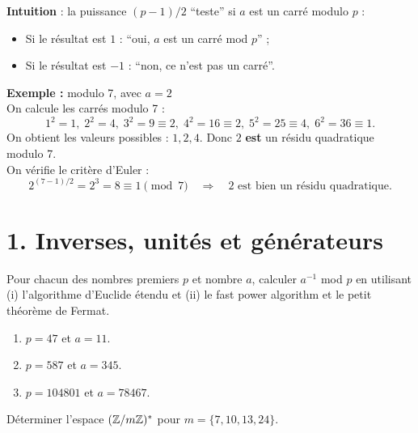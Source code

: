 \textbf{Intuition} : la puissance $(p-1)/2$ “teste” si $a$ est un carré modulo $p$ :
\begin{itemize}
    \item Si le résultat est $1$ : “oui, $a$ est un carré mod $p$” ;
    \item Si le résultat est $-1$ : “non, ce n’est pas un carré”. \\
\end{itemize}

\textbf{Exemple : } modulo 7, avec $a=2$ \\

On calcule les carrés modulo 7 :
\[
1^2 = 1,\; 2^2 = 4,\; 3^2 = 9 \equiv 2,\; 4^2 = 16 \equiv 2,\; 5^2 = 25 \equiv 4,\; 6^2 = 36 \equiv 1.
\]
On obtient les valeurs possibles : $1,2,4$. Donc $2$ \textbf{est} un résidu quadratique modulo 7. \\

On vérifie le critère d’Euler :
\[
2^{(7-1)/2} = 2^3 = 8 \equiv 1 \pmod{7} \quad \Rightarrow \quad 2 \text{ est bien un résidu quadratique.}
\]

\newpage

\section*{1. Inverses, unités et générateurs}

\begin{exercise}
    Pour chacun des nombres premiers $p$ et nombre $a$, calculer $a^{-1}$ mod $p$ en utilisant (i) l'algorithme d'Euclide étendu et (ii) le fast power algorithm et le petit théorème de Fermat.
    \begin{enumerate}[label=(\alph*)]
        \item $p=47$ et $a=11$.
        \item $p=587$ et $a=345$.
        \item $p=104801$ et $a=78467$.
    \end{enumerate}
\end{exercise}

\begin{exercise}
    Déterminer l'espace $(\mathbb{Z}/m\mathbb{Z})^*$ pour $m = \{ 7, 10, 13, 24 \}$.
\end{exercise}

